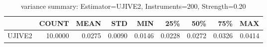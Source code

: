 \begin{table}[ht]
\centering
\caption{variance summary: Estimator=UJIVE2, Instruments=200, Strength=0.20}
\begin{tabular}{lrrrrrrrr}
\toprule
 & COUNT & MEAN & STD & MIN & 25\% & 50\% & 75\% & MAX \\
\midrule
UJIVE2 & 10.0000 & 0.0275 & 0.0090 & 0.0146 & 0.0228 & 0.0272 & 0.0326 & 0.0414 \\
\bottomrule
\end{tabular}
\end{table}
